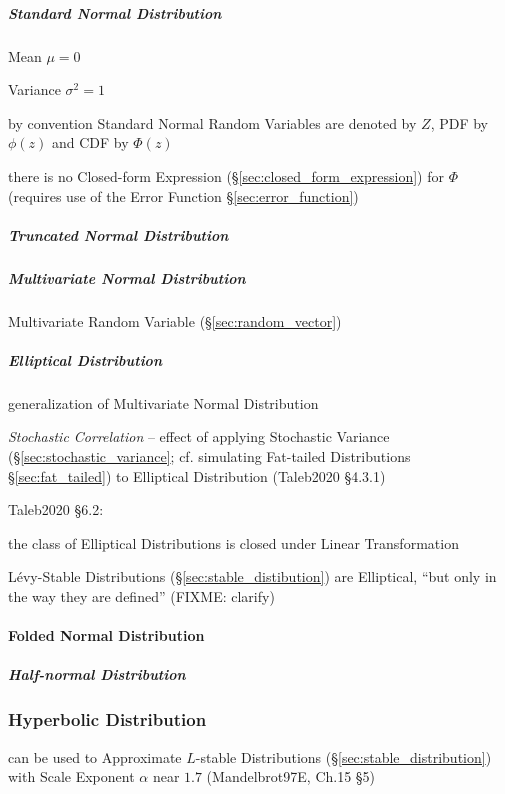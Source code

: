 \subparagraph{Standard Normal Distribution}\label{sec:standard_normal}\hfill

Mean $\mu = 0$

Variance $\sigma^2 = 1$

by convention Standard Normal Random Variables are denoted by $Z$, PDF by
$\phi(z)$ and CDF by $\Phi(z)$

there is no Closed-form Expression (\S\ref{sec:closed_form_expression}) for
$\Phi$ (requires use of the Error Function \S\ref{sec:error_function})



\subparagraph{Truncated Normal Distribution}\label{sec:truncated_normal}\hfill

\subparagraph{Multivariate Normal Distribution}\label{sec:multivariate_normal}
\hfill

Multivariate Random Variable (\S\ref{sec:random_vector})



\subparagraph{Elliptical Distribution}\label{sec:elliptical_distribution}
\hfill

generalization of Multivariate Normal Distribution

\emph{Stochastic Correlation} -- effect of applying Stochastic Variance
(\S\ref{sec:stochastic_variance}; cf.
simulating Fat-tailed Distributions \S\ref{sec:fat_tailed}) to Elliptical
Distribution (Taleb2020 \S 4.3.1)

Taleb2020 \S 6.2:

the class of Elliptical Distributions is closed under Linear Transformation

L\'evy-Stable Distributions (\S\ref{sec:stable_distibution}) are Elliptical,
``but only in the way they are defined'' (FIXME: clarify)



\paragraph{Folded Normal Distribution}\label{sec:folded_normal}\hfill

\subparagraph{Half-normal Distribution}\label{sec:half_normal}\hfill



\subsubsection{Hyperbolic Distribution}\label{sec:hyperbolic_distribution}

can be used to Approximate $L$-stable Distributions
(\S\ref{sec:stable_distribution}) with Scale Exponent $\alpha$ near $1.7$
(Mandelbrot97E, Ch.15 \S 5)



